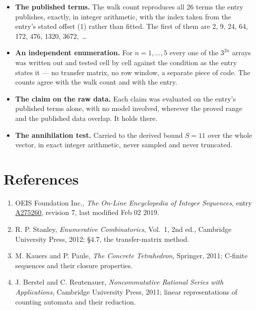 \documentclass[11pt]{article}
\theoremstyle{definition}
\begin{document}
\begin{itemize}

\item {\bfseries The published terms.} The walk count reproduces all 26 terms the entry publishes, exactly, in integer arithmetic, with the index taken from the entry's stated offset (1) rather than fitted. The first of them are 2, 9, 24, 64, 172, 476, 1320, 3672,~\dots

\item {\bfseries An independent enumeration.} For $n = 1,\dots,5$ every one of the $3^{2n}$ arrays was written out and tested cell by cell against the condition as the entry states it --- no transfer matrix, no row window, a separate piece of code. The counts agree with the walk count and with the entry.

\item {\bfseries The claim on the raw data.} Each claim was evaluated on the entry's published terms alone, with no model involved, wherever the proved range and the published data overlap. It holds there.

\item {\bfseries The annihilation test.} Carried to the derived bound $S = 11$ over the whole vector, in exact integer arithmetic, never sampled and never truncated.

\end{itemize}

\section{References}

\begin{enumerate}

\item OEIS Foundation Inc., \emph{The On-Line Encyclopedia of Integer Sequences}, entry \href{https://oeis.org/A275260}{A275260}, revision 7, last modified Feb 02 2019.

\item R. P. Stanley, \emph{Enumerative Combinatorics}, Vol.~1, 2nd ed., Cambridge University Press, 2012; \S4.7, the transfer-matrix method.

\item M. Kauers and P. Paule, \emph{The Concrete Tetrahedron}, Springer, 2011; C-finite sequences and their closure properties.

\item J. Berstel and C. Reutenauer, \emph{Noncommutative Rational Series with Applications}, Cambridge University Press, 2011; linear representations of counting automata and their reduction.

\end{enumerate}
\end{document}
